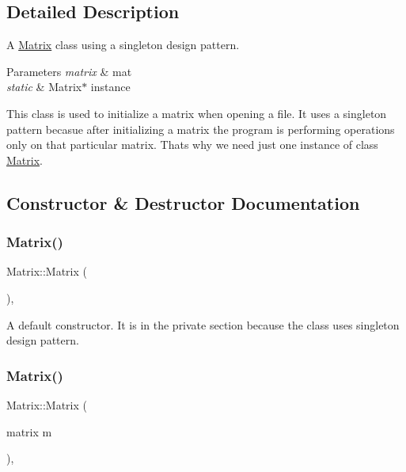 \subsection{Detailed Description}
A \hyperlink{class_matrix}{Matrix} class using a singleton design pattern. 


\begin{DoxyParams}{Parameters}
{\em matrix} & mat \\
\hline
{\em static} & Matrix$\ast$ instance\\
\hline
\end{DoxyParams}
This class is used to initialize a matrix when opening a file. It uses a singleton pattern becasue after initializing a matrix the program is performing operations only on that particular matrix. That\textquotesingle{}s why we need just one instance of class \hyperlink{class_matrix}{Matrix}. 

\subsection{Constructor \& Destructor Documentation}
\mbox{\label{class_matrix_a2dba13c45127354c9f75ef576f49269b}} 
\subsubsection{\texorpdfstring{Matrix()}{Matrix()}\hspace{0.1cm}{\footnotesize\ttfamily [1/2]}}
{\footnotesize\ttfamily Matrix\+::\+Matrix (\begin{DoxyParamCaption}{ }\end{DoxyParamCaption})\hspace{0.3cm}{\ttfamily [inline]}, {\ttfamily [private]}}

A default constructor. It is in the private section because the class uses singleton design pattern. \mbox{\label{class_matrix_abc64f3d5a4f22323a24be2bfabf377cb}} 
\subsubsection{\texorpdfstring{Matrix()}{Matrix()}\hspace{0.1cm}{\footnotesize\ttfamily [2/2]}}
{\footnotesize\ttfamily Matrix\+::\+Matrix (\begin{DoxyParamCaption}\item[{matrix}]{m }\end{DoxyParamCaption})\hspace{0.3cm}{\ttfamily [inline]}, {\ttfamily [private]}}

